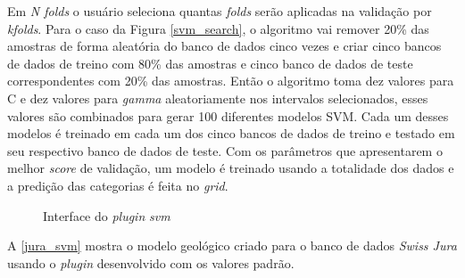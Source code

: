 Em \textit{N folds} o usuário seleciona quantas \textit{folds} serão aplicadas na validação por \textit{kfolds}. Para o caso da Figura \autoref{svm_search}, o algoritmo vai remover 20\% das amostras de forma aleatória do banco de dados cinco vezes e criar cinco bancos de dados de treino com 80\% das amostras e cinco banco de dados de teste correspondentes com 20\% das amostras. Então o algoritmo toma dez valores para C e dez valores para \textit{gamma} aleatoriamente nos intervalos selecionados, esses valores são combinados para gerar 100 diferentes modelos SVM. Cada um desses modelos é treinado em cada um dos cinco bancos de dados de treino e testado em seu respectivo banco de dados de teste. Com os parâmetros que apresentarem o melhor \textit{score} de validação, um modelo é treinado usando a totalidade dos dados e a predição das categorias é feita no \textit{grid}.

\begin{figure}[H] 
    \centering
    \caption{Interface do \textit{plugin} \textit{svm}} \label{svm_plug}
     \hspace{1em}
\end{figure}

A \autoref{jura_svm} mostra o modelo geológico criado para o banco de dados \textit{Swiss Jura} usando o \textit{plugin} desenvolvido com os valores padrão.


